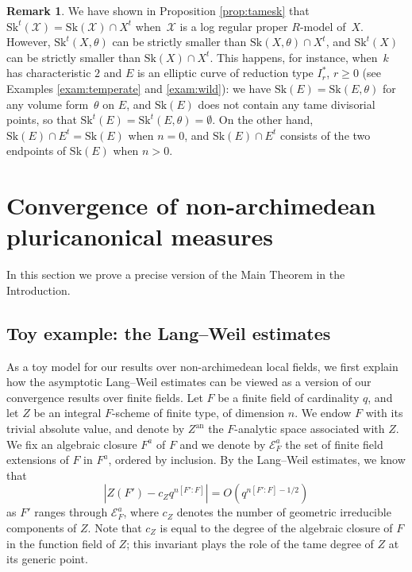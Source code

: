 \documentclass[JEP,XML,SOM,Unicode,NoFloatCountersInSection]{cedram}
\let\mathcal\mathscr
\theoremstyle{definition}
\newtheorem{remark}[equation]{Remark}
\numberwithin{equation}{subsection}
\newcommand{\cX}{\ensuremath{\mathscr{X}}}
\newcommand{\an}{\mathrm{an}}
\newcommand{\Sk}{\mathrm{Sk}}
\let\form\theta
\begin{document}
\begin{remark}
We have shown in Proposition \ref{prop:tamesk} that $\Sk^t(\cX)=\Sk(\cX)\cap X^t$ when~$\cX$ is a log regular proper $R$\nobreakdash-model of~$X$. However, $\Sk^t(X,\form)$ can be strictly smaller than $\Sk(X,\form)\cap X^t$, and $\Sk^t(X)$ can be strictly smaller than $\Sk(X)\cap X^t$.
This happens, for instance, when~$k$ has characteristic $2$ and $E$ is an elliptic curve of reduction type $I_r^{\ast}$, $r\geq 0$ (see Examples \ref{exam:temperate} and \ref{exam:wild}): we have $\Sk(E)=\Sk(E,\form)$ for any volume form~$\form$ on $E$, and $\Sk(E)$ does not contain any tame divisorial points, so that $\Sk^t(E)=\Sk^t(E,\form)=\emptyset$. On the other hand, $\Sk(E)\cap E^t=\Sk(E)$ when $n=0$, and $\Sk(E)\cap E^t$ consists of the two endpoints of $\Sk(E)$ when $n>0$.
\end{remark}

\pagebreak[2]
\section{Convergence of non-archimedean pluricanonical measures}\label{sec:padic}
In this section we prove a precise version of the Main Theorem in the Introduction.

\subsection{Toy example: the Lang--Weil estimates}\label{sec:langweil}
As a toy model for our results over non-archimedean local fields, we first explain how the asymptotic Lang--Weil estimates can be viewed as a version of our convergence results over finite fields. Let $F$ be a finite field of cardinality $q$, and let $Z$ be an integral $F$-scheme of finite type, of dimension $n$. We endow $F$ with its trivial absolute value, and denote by $Z^{\an}$ the $F$-analytic space associated with $Z$.
We fix an algebraic closure $F^a$ of $F$ and we denote by $\mathcal{E}^a_F$ the set of finite field extensions of $F$ in $F^a$, ordered by inclusion. By the Lang--Weil estimates, we know that
\[
|Z(F')-c_Zq^{n[F'\colon F]}|= O(q^{n[F'\colon F]-1/2})
\]
as $F'$ ranges through $\mathcal{E}^a_F$, where $c_Z$ denotes the number of geometric irreducible components of $Z$. Note that $c_Z$ is equal to the degree of the algebraic closure of $F$ in the function field of $Z$; this invariant plays the role of the tame degree of $Z$ at its generic point.
\end{document}

